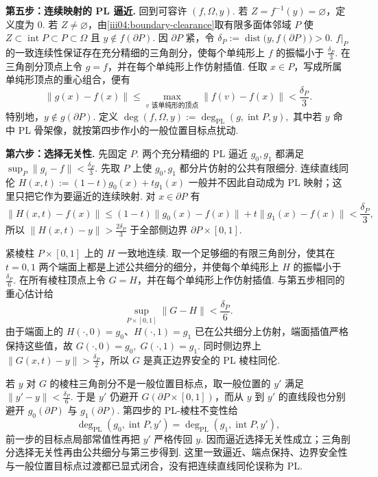 \begin{FAProof}
\textbf{第五步：连续映射的 PL 逼近.} 回到可容许 \(\displaystyle(f,\Omega,y)\). 若 \(\displaystyle Z=f^{-1}(y)=\varnothing\)，定义度为 \(\displaystyle0\). 若 \(\displaystyle Z\neq\varnothing\)，由\autoref{iii04:boundary-clearance}取有限多面体邻域 \(\displaystyle P\) 使 \(\displaystyle Z\subset\operatorname{int}P\subset P\subset\Omega\) 且 \(\displaystyle y\notin f(\partial P)\). 因 \(\displaystyle\partial P\) 紧，令
\(\displaystyle \delta_P := \operatorname{dist}\bigl(y,f(\partial P)\bigr)>0.\)
\(\displaystyle f|_P\) 的一致连续性保证存在充分精细的三角剖分，使每个单纯形上 \(\displaystyle f\) 的振幅小于 \(\displaystyle\frac{\delta_P}{3}\). 在三角剖分顶点上令 \(\displaystyle g=f\)，并在每个单纯形上作仿射插值. 任取 \(\displaystyle x\in P\)，写成所属单纯形顶点的重心组合，便有
\[
\|g(x)-f(x)\|
\leqslant
\max_{v\text{ 该单纯形的顶点}}\|f(v)-f(x)\|
<
\frac{\delta_P}{3}.
\]
特别地，\(\displaystyle y\notin g(\partial P)\). 定义
\(\displaystyle \deg(f,\Omega,y) := \deg_{\mathrm{PL}}(g,\operatorname{int}P,y),\)
其中若 \(\displaystyle y\) 命中 PL 骨架像，就按第四步作小的一般位置目标点扰动.

\textbf{第六步：选择无关性.} 先固定 \(\displaystyle P\). 两个充分精细的 PL 逼近 \(\displaystyle g_0,g_1\) 都满足 \(\displaystyle\sup_P\|g_i-f\|<\frac{\delta_P}{3}\). 先取 \(\displaystyle P\) 上使 \(\displaystyle g_0,g_1\) 都分片仿射的公共有限细分. 连续直线同伦
\(\displaystyle H(x,t):=(1-t)g_0(x)+tg_1(x)\)
一般并不因此自动成为 PL 映射；这里只把它作为要逼近的连续映射. 对 \(\displaystyle x\in\partial P\) 有
\[
\|H(x,t)-f(x)\|
\leqslant
(1-t)\|g_0(x)-f(x)\|+t\|g_1(x)-f(x)\|
<
\frac{\delta_P}{3},
\]
所以 \(\displaystyle\|H(x,t)-y\|>\frac{2\delta_P}{3}\) 于全部侧边界 \(\displaystyle\partial P\times[0,1]\).

紧棱柱 \(\displaystyle P\times[0,1]\) 上的 \(\displaystyle H\) 一致地连续. 取一个足够细的有限三角剖分，使其在 \(\displaystyle t=0,1\) 两个端面上都是上述公共细分的细分，并使每个单纯形上 \(\displaystyle H\) 的振幅小于 \(\displaystyle\frac{\delta_P}{6}\). 在所有棱柱顶点上令 \(\displaystyle G=H\)，并在每个单纯形上作仿射插值. 与第五步相同的重心估计给
\[
\sup_{P\times[0,1]}\|G-H\|<\frac{\delta_P}{6}.
\]
由于端面上的 \(\displaystyle H(\cdot,0)=g_0\)、\(\displaystyle H(\cdot,1)=g_1\) 已在公共细分上仿射，端面插值严格保持这些值，故
\(\displaystyle G(\cdot,0)=g_0,\; G(\cdot,1)=g_1.\)
同时侧边界上 \(\displaystyle\|G(x,t)-y\|>\frac{\delta_P}{2}\)，所以 \(\displaystyle G\) 是真正边界安全的 PL 棱柱同伦.

若 \(\displaystyle y\) 对 \(\displaystyle G\) 的棱柱三角剖分不是一般位置目标点，取一般位置的 \(\displaystyle y'\) 满足 \(\displaystyle\|y'-y\|<\frac{\delta_P}{6}\). 于是 \(\displaystyle y'\) 仍避开 \(\displaystyle G(\partial P\times[0,1])\)，而从 \(\displaystyle y\) 到 \(\displaystyle y'\) 的直线段也分别避开 \(\displaystyle g_0(\partial P)\) 与 \(\displaystyle g_1(\partial P)\). 第四步的 PL-棱柱不变性给
\[
\deg_{\mathrm{PL}}(g_0,\operatorname{int}P,y')
=
\deg_{\mathrm{PL}}(g_1,\operatorname{int}P,y'),
\]
前一步的目标点局部常值性再把 \(\displaystyle y'\) 严格传回 \(\displaystyle y\). 因而逼近选择无关性成立；三角剖分选择无关性再由公共细分与第三步得到. 这里一致逼近、端点保持、边界安全性与一般位置目标点过渡都已显式闭合，没有把连续直线同伦误称为 PL.


\end{FAProof}
